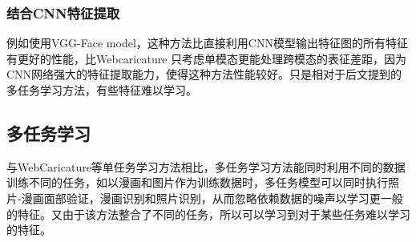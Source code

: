 \documentclass[12pt]{article}
\begin{document}
\begin{sloppypar}
\begin{multicols*}{2}
\subsubsection{结合CNN特征提取}
例如使用VGG-Face model，这种方法比直接利用CNN模型输出特征图的所有特征有更好的性能，比Webcaricature 只考虑单模态更能处理跨模态的表征差距，因为CNN网络强大的特征提取能力，使得这种方法性能较好。只是相对于后文提到的多任务学习方法，有些特征难以学习。

\subsection{多任务学习}
与WebCaricature等单任务学习方法相比，多任务学习方法能同时利用不同的数据训练不同的任务，如以漫画和图片作为训练数据时，多任务模型可以同时执行照片-漫画面部验证，漫画识别和照片识别，从而忽略依赖数据的噪声以学习更一般的特征。又由于该方法整合了不同的任务，所以可以学习到对于某些任务难以学习的特征。

\end{multicols*}
\end{sloppypar}
\end{document}
